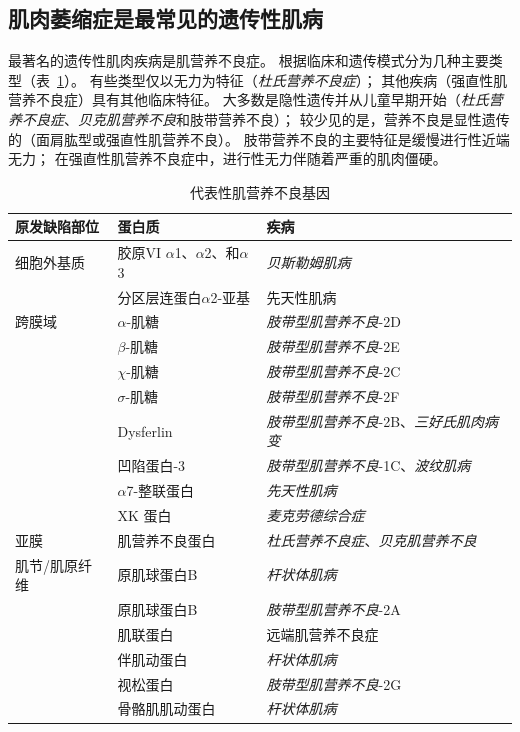 \subsection{肌肉萎缩症是最常见的遗传性肌病}

最著名的遗传性肌肉疾病是肌营养不良症。
根据临床和遗传模式分为几种主要类型（表~\ref{tab:57_4}）。
有些类型仅以无力为特征（\textit{杜氏营养不良症}）；
其他疾病（强直性肌营养不良症）具有其他临床特征。
大多数是隐性遗传并从儿童早期开始（\textit{杜氏营养不良症}、\textit{贝克肌营养不良}和肢带营养不良）；
较少见的是，营养不良是显性遗传的（面肩肱型或强直性肌营养不良）。
肢带营养不良的主要特征是缓慢进行性近端无力；
在强直性肌营养不良症中，进行性无力伴随着严重的肌肉僵硬。


\begin{table}[htbp]
	\caption{代表性肌营养不良基因} \label{tab:57_4} \centering
	\begin{tabular}{lll}
		\toprule
		原发缺陷部位 & 蛋白质 & 疾病 \\
		\midrule
		细胞外基质 & 胶原VI $\alpha$1、$\alpha$2、和$\alpha$3 & \textit{贝斯勒姆肌病} \\
		 & 分区层连蛋白$\alpha$2-亚基 & 先天性肌病 \\
		跨膜域 & $\alpha$-肌糖 & \textit{肢带型肌营养不良}-2D \\
		 & $\beta$-肌糖 & \textit{肢带型肌营养不良}-2E \\
		 & $\chi$-肌糖 & \textit{肢带型肌营养不良}-2C \\
		 & $\sigma$-肌糖 & \textit{肢带型肌营养不良}-2F \\
		 & Dysferlin & \textit{肢带型肌营养不良}-2B、\textit{三好氏肌肉病变} \\
		 & 凹陷蛋白-3 & \textit{肢带型肌营养不良}-1C、\textit{波纹肌病} \\
		 & $\alpha$7-整联蛋白 & \textit{先天性肌病} \\
		 & XK 蛋白 & \textit{麦克劳德综合症} \\
		亚膜 & 肌营养不良蛋白 & \textit{杜氏营养不良症}、\textit{贝克肌营养不良} \\
		肌节/肌原纤维 & 原肌球蛋白B & \textit{杆状体肌病} \\
		 & 原肌球蛋白B & \textit{肢带型肌营养不良}-2A \\
		 & 肌联蛋白 & 远端肌营养不良症 \\
		 & 伴肌动蛋白 & \textit{杆状体肌病} \\
		 & 视松蛋白 & \textit{肢带型肌营养不良}-2G \\
		 & 骨骼肌肌动蛋白 & \textit{杆状体肌病} \\

\end{tabular}
\end{table}
